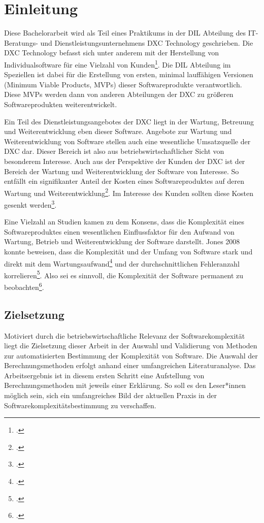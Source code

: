\chapter{Einleitung}\label{einleitung}

Diese Bachelorarbeit wird als Teil eines Praktikums in der \ac{DIL} Abteilung des IT-Beratungs- und
Dienstleistungsunternehmens DXC Technology geschrieben. Die DXC
Technology befasst sich unter anderem mit der Herstellung von
Individualsoftware für eine Vielzahl von Kunden\footcite[Vgl. ][]{InterviewMitVertretern2022}.
Die DIL Abteilung im Speziellen ist dabei für die Erstellung von ersten,
minimal lauffähigen Versionen (Minimum Viable Products, MVPs) dieser
Softwareprodukte verantwortlich. Diese MVPs werden dann von anderen
Abteilungen der DXC zu größeren Softwareprodukten weiterentwickelt.

Ein Teil des Dienstleistungsangebotes der DXC liegt in der Wartung,
Betreuung und Weiterentwicklung eben dieser Software. Angebote zur
Wartung und Weiterentwicklung von Software stellen auch eine wesentliche
Umsatzquelle der DXC dar. Dieser Bereich ist also aus
betriebswirtschaftlicher Sicht von besonderem Interesse. Auch aus der
Perspektive der Kunden der DXC ist der Bereich der Wartung und
Weiterentwicklung der Software von Interesse. So entfällt ein
signifikanter Anteil der Kosten eines Softwareproduktes auf deren
Wartung und Weiterentwicklung\footcite[Vgl. ][S. 301]{jonesAppliedSoftwareMeasurement2008}. Im Interesse des
Kunden sollten diese Kosten gesenkt werden\footcite[Vgl. ][]{InterviewMitMitarbeiterin2022}.

Eine Vielzahl an Studien kamen zu dem Konsens, dass die Komplexität
eines Softwareproduktes einen wesentlichen Einflussfaktor für den
Aufwand von Wartung, Betrieb und Weiterentwicklung der Software
darstellt. Jones 2008 konnte beweisen, dass die Komplexität und der
Umfang von Software stark und direkt mit dem Wartungsaufwand\footcite[Vgl. ][S. 64, 335 und 627]{jonesAppliedSoftwareMeasurement2008} und der durchschnittlichen Fehleranzahl
korrelieren\footcite[Vgl. ][S. 64 und 503]{jonesAppliedSoftwareMeasurement2008}. Also sei es sinnvoll,
die Komplexität der Software permanent zu beobachten\footcite[Vgl. ][S. 503]{jonesAppliedSoftwareMeasurement2008}.

\section{Zielsetzung}\label{zielsetzung}

Motiviert durch die betriebswirtschaftliche Relevanz der
Softwarekomplexität liegt die Zielsetzung dieser Arbeit in der Auswahl
und Validierung von Methoden zur automatisierten Bestimmung der
Komplexität von Software. Die Auswahl der Berechnungsmethoden erfolgt
anhand einer umfangreichen Literaturanalyse. Das Arbeitsergebnis ist in
diesem ersten Schritt eine Aufstellung von Berechnungsmethoden mit
jeweils einer Erklärung. So soll es den Leser*innen möglich sein, sich
ein umfangreiches Bild der aktuellen Praxis in der
Softwarekomplexitätsbestimmung zu verschaffen.

